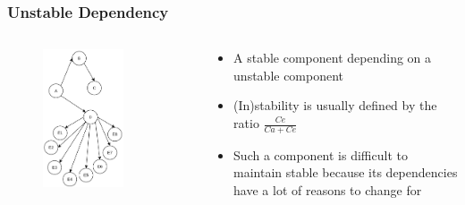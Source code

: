 \documentclass[dvipsnames, 10pt]{beamer}
\begin{document}
\begin{frame}
  \frametitle{Unstable Dependency}
  \begin{columns}
    \begin{column}{0.5\textwidth}
      \begin{figure}
        \begin{center}
          \includegraphics[width=0.7\textwidth]{figures/architectural-smells/unstable-dependency.png}
        \end{center}
      \end{figure}
    \end{column}
    \begin{column}{0.5\textwidth}
      \begin{itemize}
        \item A stable component depending on a unstable component
        \item (In)stability is usually defined by the ratio $\frac {Ce} {Ca + Ce}$
        \item Such a component is difficult to maintain stable because its dependencies have a lot of reasons to change for
      \end{itemize}
    \end{column}
  \end{columns}
\end{frame}
\end{document}
